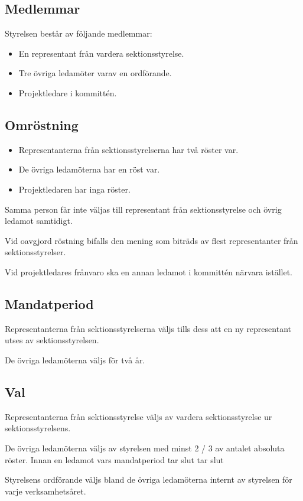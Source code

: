 \documentclass{article}
\begin{document}
\subsection{Medlemmar}
Styrelsen består av följande medlemmar:
\begin{itemize}
    \item En representant från vardera sektionsstyrelse.
    \item Tre övriga ledamöter varav en ordförande.
    \item Projektledare i kommittén.
\end{itemize}

\subsection{Omröstning}
\begin{itemize}
    \item Representanterna från sektionsstyrelserna har två röster var.
    \item De övriga ledamöterna har en röst var.
    \item Projektledaren har inga röster.
\end{itemize}

Samma person får inte väljas till representant från sektionsstyrelse och övrig ledamot samtidigt.

Vid oavgjord röstning bifalls den mening som biträds av flest representanter från sektionsstyrelser.

Vid projektledares frånvaro ska en annan ledamot i kommittén närvara istället.

\subsection{Mandatperiod}
Representanterna från sektionsstyrelserna väljs tills dess att en ny representant utses av sektionsstyrelsen.

De övriga ledamöterna väljs för två år.

\subsection{Val}
Representanterna från sektionsstyrelse väljs av vardera sektionsstyrelse ur sektionsstyrelsens.

De övriga ledamöterna väljs av styrelsen med minst 2 / 3 av antalet absoluta röster. Innan en ledamot vars mandatperiod tar slut tar slut

Styrelsens ordförande väljs bland de övriga ledamöterna internt av styrelsen för varje verksamhetsåret.
\end{document}
